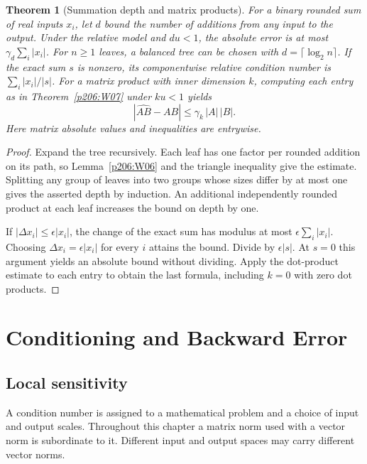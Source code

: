 \documentclass[11pt,oneside,openany]{book}
\theoremstyle{plain}
\newtheorem{theorem}{Theorem}[chapter]
\theoremstyle{definition}
\theoremstyle{remark}
\begin{document}
\begin{theorem}[Summation depth and matrix products]\label{p206:W08}
For a binary rounded sum of real inputs \(x_i\), let \(d\)
bound the number of additions from any input to the output.
Under the relative model and \(du<1\),
the absolute error is at most \(\gamma_d\sum_i|x_i|\).
For \(n\ge1\) leaves, a balanced tree can be chosen with
\(d=\lceil\log_2 n\rceil\). If the exact sum \(s\) is nonzero,
its componentwise relative condition number is
\(\sum_i|x_i|/|s|\).
For a matrix product with inner dimension \(k\), computing each
entry as in Theorem~\ref{p206:W07} under \(ku<1\) yields
\[
       |\widehat{AB}-AB|\le \gamma_k\,|A|\,|B|.
\]
Here matrix absolute values and inequalities are entrywise.
\end{theorem}
\begin{proof}
Expand the tree recursively. Each leaf has one factor per
rounded addition on its path, so Lemma~\ref{p206:W06} and
the triangle inequality give the estimate. Splitting any group
of leaves into two groups whose sizes differ by at most one gives
the asserted depth by induction. An additional independently
rounded product at each leaf increases the bound on depth by one.

If \(|\Delta x_i|\le\epsilon |x_i|\), the change of the exact sum
has modulus at most \(\epsilon\sum_i |x_i|\). Choosing
\(\Delta x_i=\epsilon|x_i|\) for every \(i\) attains the bound.
Divide by \(\epsilon|s|\). At \(s=0\) this argument yields an
absolute bound without dividing. Apply the dot-product estimate
to each entry to obtain the last formula, including \(k=0\)
with zero dot products.
\end{proof}
\chapter{Conditioning and Backward Error}

\section{Local sensitivity}

A condition number is assigned to a mathematical problem and a
choice of input and output scales. Throughout this chapter a matrix
norm used with a vector norm is subordinate to it. Different input
and output spaces may carry different vector norms.
\end{document}
